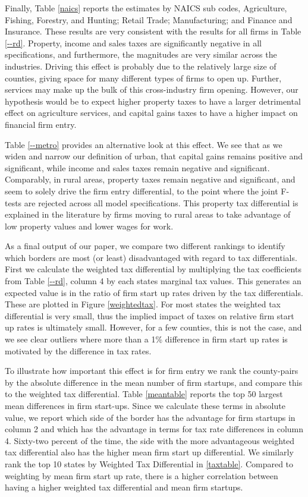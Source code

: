 \documentclass[12pt,a4paper]{article}
\begin{document}
Finally, Table \ref{naics} reports the estimates by NAICS sub codes,  Agriculture, Fishing, Forestry, and Hunting; Retail Trade; Manufacturing; and Finance and Insurance. These results are very consistent with the results for all firms in Table \ref{--rd}. Property, income and sales taxes are significantly negative in all specifications, and furthermore, the magnitudes are very similar across the industries. Driving this effect is probably due to the relatively large size of counties, giving space for many different types of firms to open up. Further, services may make up the bulk of this cross-industry firm opening. However, our hypothesis would be to expect higher property taxes to have a larger detrimental effect on agriculture services, and capital gains taxes to have a higher impact on financial firm entry.

 Table \ref{--metro} provides an alternative look at this effect. We see that as we widen and narrow our definition of urban, that capital gains remains positive and significant, while income and sales taxes remain negative and significant. Comparably, in rural areas, property taxes remain negative and significant, and seem to solely drive the firm entry differential, to the point where the joint F-tests are rejected across all model specifications. This property tax differential is explained in the literature by firms moving to rural areas to take advantage of low property values and lower wages for work.
 
As a final output of our paper, we compare two different rankings to identify which borders are most (or least) disadvantaged with regard to tax differentials. First we calculate the weighted tax differential by multiplying the tax coefficients from Table \ref{--rd}, column 4 by each states marginal tax values. This generates an expected value is in the ratio of firm start up rates driven by the tax differentials.  These are plotted in Figure \ref{weightedtax}. For most states the weighted tax differential is very small, thus the implied impact of taxes on relative firm start up rates is ultimately small. However, for a few counties, this is not the case, and we see clear outliers where more than a 1\% difference in firm start up rates is motivated by the difference in tax rates. 

To illustrate how important this effect is for firm entry we rank the county-pairs by the absolute difference in the mean number of firm startups, and compare this to the weighted tax differential. Table \ref{meantable} reports the top 50 largest mean differences in firm start-ups.  Since we calculate these terms in absolute value, we report which side of the border has  the advantage for firm startups in column 2 and which has the advantage in terms for tax rate differences in column 4.  Sixty-two percent of the time, the side with the more advantageous weighted tax differential also has the higher mean firm start up differential. We similarly rank the top 10 states by Weighted Tax Differential in \ref{taxtable}. Compared to weighting by mean firm start up rate, there is a higher correlation between having a higher weighted tax differential and mean firm startups.
\end{document}
